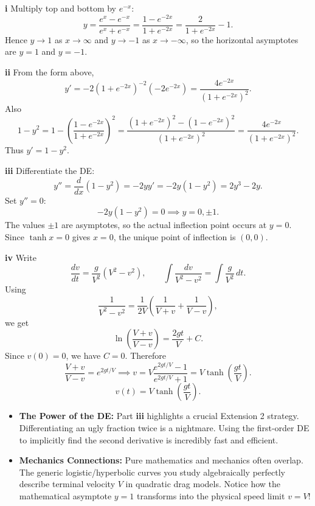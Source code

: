 \begin{solution}
\textbf{i} Multiply top and bottom by $e^{-x}$:
\[
y=\frac{e^x-e^{-x}}{e^x+e^{-x}}=\frac{1-e^{-2x}}{1+e^{-2x}}
=\frac{2}{1+e^{-2x}}-1.
\]
Hence $y\to 1$ as $x\to\infty$ and $y\to -1$ as $x\to-\infty$, so the horizontal asymptotes are $\boxed{y=1}$ and $\boxed{y=-1}$.

\textbf{ii} From the form above,
\[
y'= -2(1+e^{-2x})^{-2}(-2e^{-2x})=\frac{4e^{-2x}}{(1+e^{-2x})^2}.
\]
Also
\[
1-y^2
=1-\left(\frac{1-e^{-2x}}{1+e^{-2x}}\right)^2
=\frac{(1+e^{-2x})^2-(1-e^{-2x})^2}{(1+e^{-2x})^2}
=\frac{4e^{-2x}}{(1+e^{-2x})^2}.
\]
Thus $\boxed{y'=1-y^2}$.

\textbf{iii} Differentiate the DE:
\[
y''=\frac{d}{dx}(1-y^2)=-2yy'=-2y(1-y^2)=2y^3-2y.
\]
Set $y''=0$:
\[
-2y(1-y^2)=0 \implies y=0,\pm1.
\]
The values $\pm1$ are asymptotes, so the actual inflection point occurs at $y=0$. Since $\tanh x=0$ gives $x=0$, the unique point of inflection is $\boxed{(0,0)}$.

\textbf{iv} Write
\[
\frac{dv}{dt}=\frac{g}{V^2}(V^2-v^2), \qquad
\int \frac{dv}{V^2-v^2}=\int \frac{g}{V^2}\,dt.
\]
Using
\[
\frac{1}{V^2-v^2}=\frac{1}{2V}\left(\frac{1}{V+v}+\frac{1}{V-v}\right),
\]
we get
\[
\ln\left(\frac{V+v}{V-v}\right)=\frac{2gt}{V}+C.
\]
Since $v(0)=0$, we have $C=0$. Therefore
\[
\frac{V+v}{V-v}=e^{2gt/V}
\implies
v=V\frac{e^{2gt/V}-1}{e^{2gt/V}+1}
=V\tanh\left(\frac{gt}{V}\right).
\]
\[
\boxed{v(t)=V\tanh\left(\frac{gt}{V}\right)}.
\]
\end{solution}

\begin{takeaways}
\begin{itemize}[leftmargin=*]
    \item \textbf{The Power of the DE:} Part \textbf{iii} highlights a crucial Extension 2 strategy. Differentiating an ugly fraction twice is a nightmare. Using the first-order DE to implicitly find the second derivative is incredibly fast and efficient.
    \item \textbf{Mechanics Connections:} Pure mathematics and mechanics often overlap. The generic logistic/hyperbolic curves you study algebraically perfectly describe terminal velocity $V$ in quadratic drag models. Notice how the mathematical asymptote $y=1$ transforms into the physical speed limit $v=V$!
\end{itemize}
\end{takeaways}


